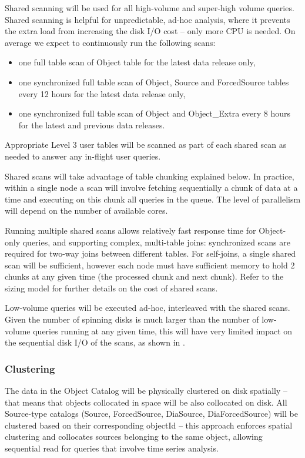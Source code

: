 \documentclass[DM,lsstdraft,toc]{lsstdoc}
\begin{document}
Shared scanning will be used for all high-volume and super-high volume
queries. Shared scanning is helpful for unpredictable, ad-hoc analysis,
where it prevents the extra load from increasing the disk I/O cost --
only more CPU is needed. On average we expect to continuously run the
following scans:

\begin{itemize}
\item
  one full table scan of Object table for the latest data release only,
\item
  one synchronized full table scan of Object, Source and ForcedSource
  tables every 12 hours for the latest data release only,
\item
  one synchronized full table scan of Object and Object\_Extra every 8
  hours for the latest and previous data releases.
\end{itemize}

Appropriate Level 3 user tables will be scanned as part of each shared
scan as needed to answer any in-flight user queries.

Shared scans will take advantage of table chunking explained below. In
practice, within a single node a scan will involve fetching sequentially
a chunk of data at a time and executing on this chunk all queries in the
queue. The level of parallelism will depend on the number of available
cores.

Running multiple shared scans allows relatively fast response time for
Object-only queries, and supporting complex, multi-table joins:
synchronized scans are required for two-way joins between different
tables. For self-joins, a single shared scan will be sufficient,
however each node must have sufficient memory to hold 2 chunks at any
given time (the processed chunk and next chunk). Refer to the sizing
model  for further details on the cost of shared scans.

Low-volume queries will be executed ad-hoc, interleaved with the shared
scans. Given the number of spinning disks is much larger than the number
of low-volume queries running at any given time, this will have very
limited impact on the sequential disk I/O of the scans, as shown in
.

\subsubsection{Clustering}\label{clustering}

The data in the Object Catalog will be physically clustered on disk
spatially -- that means that objects collocated in space will be also
collocated on disk. All Source-type catalogs (Source, ForcedSource,
DiaSource, DiaForcedSource) will be clustered based on their
corresponding objectId -- this approach enforces spatial clustering and
collocates sources belonging to the same object, allowing sequential
read for queries that involve time series analysis.
\end{document}
